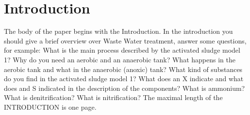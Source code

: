 \section*{Introduction}\label{sec:Introduction} 
The body of the paper begins with the Introduction. In the introduction you should give a brief overview over Waste Water treatment, answer some questions, for example: What is the main process described by the activated sludge model 1? Why do you need an aerobic and an anaerobic tank? What happens in the aerobic tank and what in the anaerobic (anoxic) tank? What kind of substances do you find in the activated sludge model 1? What does an X indicate and what does and S indicated in the description of the components? What is ammonium? What is denitrification? What is nitrification? The maximal length of the INTRODUCTION is one page.